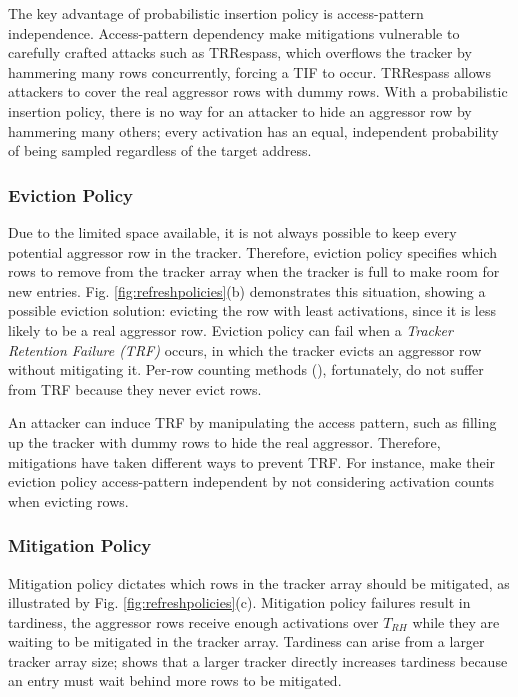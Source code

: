 \documentclass[journal,twocolumn]{IEEEtran}
\begin{document}
The key advantage of probabilistic insertion policy is access-pattern independence. Access-pattern dependency make mitigations vulnerable to carefully crafted attacks such as TRRespass\cite{Frigo20}, which overflows the tracker by hammering many rows concurrently, forcing a TIF to occur. TRRespass allows attackers to cover the real aggressor rows with dummy rows. With a probabilistic insertion policy, there is no way for an attacker to hide an aggressor row by hammering many others; every activation has an equal, independent probability of being sampled regardless of the target address.

\subsubsection{Eviction Policy}

Due to the limited space available, it is not always possible to keep every potential aggressor row in the tracker. Therefore, eviction policy specifies which rows to remove from the tracker array when the tracker is full to make room for new entries. Fig. \ref{fig:refreshpolicies}(b) demonstrates this situation, showing a possible eviction solution: evicting the row with least activations, since it is less likely to be a real aggressor row. Eviction policy can fail when a \textit{Tracker Retention Failure (TRF)} occurs, in which the tracker evicts an aggressor row without mitigating it. Per-row counting methods (\cite{Olgun24,JESD79-5C,Demirseren24,Woo25}), fortunately, do not suffer from TRF because they never evict rows.

An attacker can induce TRF by manipulating the access pattern, such as filling up the tracker with dummy rows to hide the real aggressor. Therefore, mitigations have taken different ways to prevent TRF. For instance, \cite{Bostanci24, Jaleel24} make their eviction policy access-pattern independent by not considering activation counts when evicting rows.

\subsubsection{Mitigation Policy}

Mitigation policy dictates which rows in the tracker array should be mitigated, as illustrated by Fig. \ref{fig:refreshpolicies}(c). Mitigation policy failures result in tardiness, the aggressor rows receive enough activations over $T_{RH}$ while they are waiting to be mitigated in the tracker array. Tardiness can arise from a larger tracker array size; \cite{Jaleel24} shows that a larger tracker directly increases tardiness because an entry must wait behind more rows to be mitigated.
\end{document}
